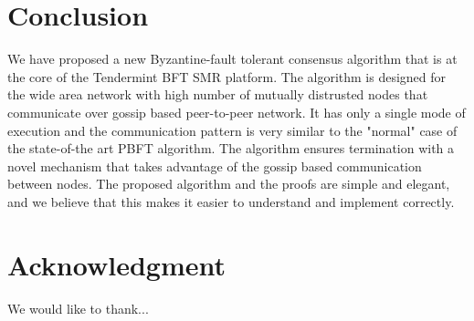 \section{Conclusion}
\label{sec:conclusion}

We have proposed a new Byzantine-fault tolerant consensus algorithm that is at the core of the Tendermint BFT SMR platform. The algorithm
is designed for the wide area network with high number of mutually distrusted nodes that communicate over gossip based peer-to-peer network. It has only a single mode of execution and the communication pattern is very similar to the "normal" case of the state-of-the art PBFT algorithm. The algorithm ensures termination with a novel mechanism that takes advantage of the gossip based communication between nodes.
The proposed algorithm and the proofs are simple and elegant, and we believe that this makes it easier to understand and implement correctly.   

\section*{Acknowledgment}

We would like to thank...